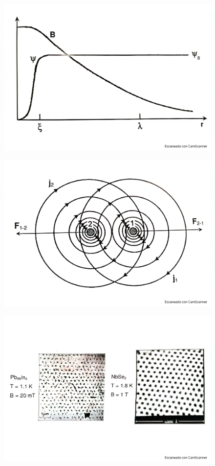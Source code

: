 \begin{figure}[h!] \centering
	\includegraphics[scale=0.5]{Cuerpo/Ch_11/Fotos libro 15.pdf}
	\caption{}
	\label{Fig:11-15}
\end{figure}
\begin{figure}[h!] \centering
	\includegraphics[scale=0.5]{Cuerpo/Ch_11/Fotos libro 16.pdf}
	\caption{}
	\label{Fig:11-16}
\end{figure}
\begin{figure}[h!] \centering
	\includegraphics[scale=0.5]{Cuerpo/Ch_11/Fotos libro 17.pdf}
	\caption{}
	\label{Fig:11-17}
\end{figure}
